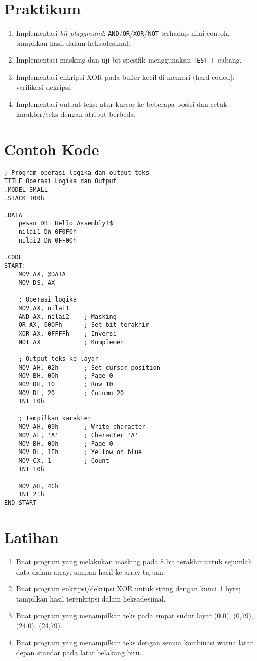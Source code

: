 \section{Praktikum}
\begin{enumerate}
  \item Implementasi \textit{bit playground}: \texttt{AND}/\texttt{OR}/\texttt{XOR}/\texttt{NOT} terhadap nilai contoh, tampilkan hasil dalam heksadesimal.
  \item Implementasi masking dan uji bit spesifik menggunakan \texttt{TEST} + cabang.
  \item Implementasi enkripsi XOR pada buffer kecil di memori (hard-coded); verifikasi dekripsi.
  \item Implementasi output teks: atur kursor ke beberapa posisi dan cetak karakter/teks dengan atribut berbeda.
\end{enumerate}

\section{Contoh Kode}
\begin{verbatim}
; Program operasi logika dan output teks
TITLE Operasi Logika dan Output
.MODEL SMALL
.STACK 100h

.DATA
    pesan DB 'Hello Assembly!$'
    nilai1 DW 0F0F0h
    nilai2 DW 0FF00h

.CODE
START:
    MOV AX, @DATA
    MOV DS, AX
    
    ; Operasi logika
    MOV AX, nilai1
    AND AX, nilai2    ; Masking
    OR AX, 000Fh      ; Set bit terakhir
    XOR AX, 0FFFFh    ; Inversi
    NOT AX            ; Komplemen
    
    ; Output teks ke layar
    MOV AH, 02h       ; Set cursor position
    MOV BH, 00h       ; Page 0
    MOV DH, 10        ; Row 10
    MOV DL, 20        ; Column 20
    INT 10h
    
    ; Tampilkan karakter
    MOV AH, 09h       ; Write character
    MOV AL, 'A'       ; Character 'A'
    MOV BH, 00h       ; Page 0
    MOV BL, 1Eh       ; Yellow on blue
    MOV CX, 1         ; Count
    INT 10h
    
    MOV AH, 4Ch
    INT 21h
END START
\end{verbatim}

\section{Latihan}
\begin{enumerate}
  \item Buat program yang melakukan masking pada 8 bit terakhir untuk sejumlah data dalam array; simpan hasil ke array tujuan.
  \item Buat program enkripsi/dekripsi XOR untuk string dengan kunci 1 byte; tampilkan hasil terenkripsi dalam heksadesimal.
  \item Buat program yang menampilkan teks pada empat sudut layar (0,0), (0,79), (24,0), (24,79).
  \item Buat program yang menampilkan teks dengan semua kombinasi warna latar depan standar pada latar belakang biru.
\end{enumerate}

